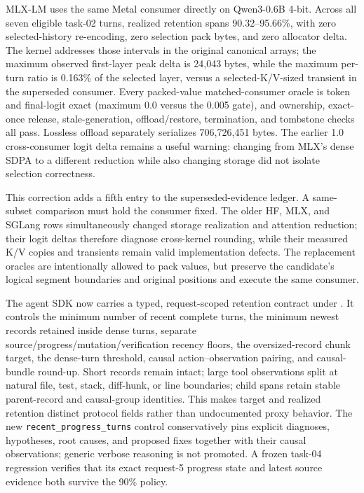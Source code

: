 \documentclass[11pt]{article}
\begin{document}
MLX-LM uses the same Metal consumer directly on Qwen3-0.6B 4-bit.  Across all
seven eligible task-02 turns, realized retention spans 90.32--95.66\%, with
zero selected-history re-encoding, zero selection pack bytes, and zero allocator
delta.  The kernel addresses those intervals in the original canonical arrays;
the maximum observed first-layer peak delta is 24,043 bytes, while the maximum
per-turn ratio is 0.163\% of
the selected layer, versus a selected-K/V-sized transient in the superseded
consumer.  Every packed-value matched-consumer oracle is token and final-logit
exact (maximum 0.0 versus the 0.005 gate), and ownership, exact-once release,
stale-generation, offload/restore, termination, and tombstone checks all pass.
Lossless offload separately serializes 706,726,451 bytes.  The earlier 1.0
cross-consumer logit delta remains a useful warning: changing from MLX's dense
SDPA to a different reduction while also changing storage did not isolate
selection correctness.

This correction adds a fifth entry to the superseded-evidence ledger.  A
same-subset comparison must hold the consumer fixed.  The older HF, MLX, and
SGLang rows simultaneously changed storage realization and attention reduction;
their logit deltas therefore diagnose cross-kernel rounding, while their measured
K/V copies and transients remain valid implementation defects.  The replacement
oracles are intentionally allowed to pack values, but preserve the candidate's
logical segment boundaries and original positions and execute the same consumer.

The agent SDK now carries a typed, request-scoped retention contract under
.  It controls the minimum number of
recent complete turns, the minimum newest records retained inside dense turns,
separate source/progress/mutation/verification recency floors, the oversized-record
chunk target, the dense-turn threshold, causal action--observation pairing, and
causal-bundle round-up.  Short records remain intact; large tool observations
split at natural file, test, stack, diff-hunk, or line boundaries; child spans
retain stable parent-record and causal-group identities.  This makes target and
realized retention distinct protocol fields rather than undocumented proxy
behavior.  The new \texttt{recent\_progress\_turns} control conservatively pins
explicit diagnoses, hypotheses, root causes, and proposed fixes together with
their causal observations; generic verbose reasoning is not promoted.  A
frozen task-04 regression verifies that its exact request-5 progress state and
latest source evidence both survive the 90\% policy.
\end{document}
